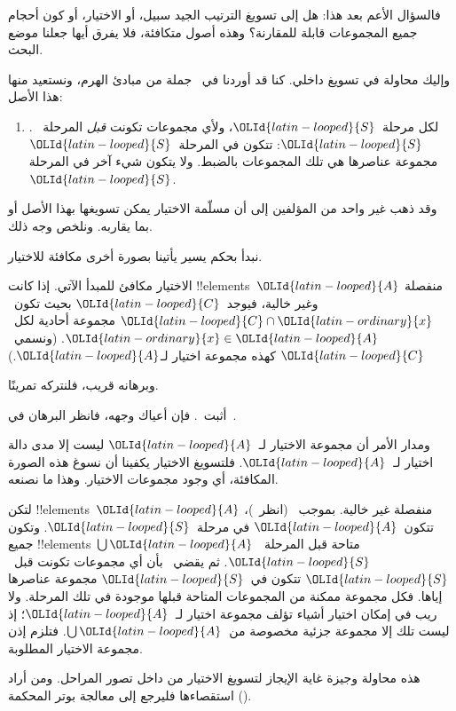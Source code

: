 \documentclass[../../../include/open-logic-section]{subfiles}
\begin{document}

فالسؤال الأعم بعد هذا: هل إلى تسويغ الترتيب الجيد سبيل، أو الاختيار،
أو كون أحجام جميع المجموعات قابلة للمقارنة؟ وهذه أصول متكافئة، فلا
يفرق أيها جعلنا موضع البحث.

وإليك محاولة في تسويغ داخلي. كنا قد أوردنا في~
جملة من مبادئ الهرم، ونستعيد منها هذا الأصل:
\begin{enumerate}
	\item[] \stagesacc. لكل مرحلة~${\OLId{latin-looped}{S}}$، ولأي مجموعات تكونت
	\emph{قبل} المرحلة~${\OLId{latin-looped}{S}}$: تتكون في المرحلة~${\OLId{latin-looped}{S}}$ مجموعة عناصرها هي تلك
	المجموعات بالضبط. ولا يتكون شيء آخر في المرحلة~${\OLId{latin-looped}{S}}$.
\end{enumerate}
وقد ذهب غير واحد من المؤلفين إلى أن مسلّمة الاختيار يمكن تسويغها بهذا
الأصل أو بما يقاربه. ونلخص وجه ذلك.

نبدأ بحكم يسير يأتينا بصورة أخرى مكافئة للاختيار.

\begin{thm}[في $\ZF$]
الاختيار مكافئ للمبدأ الآتي. إذا كانت !!{element}s~${\OLId{latin-looped}{A}}$ منفصلة وغير
خالية، فيوجد~${\OLId{latin-looped}{C}}$ بحيث تكون~${\OLId{latin-looped}{C}} \cap {\OLId{latin-ordinary}{x}}$ مجموعة أحادية لكل~${\OLId{latin-ordinary}{x}} \in {\OLId{latin-looped}{A}}$.
(ونسمي~${\OLId{latin-looped}{C}}$ كهذه {مجموعة اختيار} لـ${\OLId{latin-looped}{A}}$.)
\end{thm}

وبرهانه قريب، فلنتركه تمرينًا.

\begin{prob}
أثبت~. فإن أعياك وجهه،
فانظر البرهان في~\cite[pp.~242--3]{Potter2004}.
\end{prob}

ومدار الأمر أن مجموعة الاختيار لـ~${\OLId{latin-looped}{A}}$ ليست إلا مدى دالة اختيار
لـ~${\OLId{latin-looped}{A}}$. فلتسويغ الاختيار يكفينا أن نسوغ هذه الصورة المكافئة، أي وجود
مجموعات الاختيار. وهذا ما نصنعه.

لتكن !!{element}s~${\OLId{latin-looped}{A}}$ منفصلة غير خالية. بموجب~\stageshier{}
(انظر~)، تتكون~${\OLId{latin-looped}{A}}$ في مرحلة~${\OLId{latin-looped}{S}}$. وتكون جميع
!!{element}s~$\bigcup {\OLId{latin-looped}{A}}$ متاحة قبل المرحلة~${\OLId{latin-looped}{S}}$. ثم يقضي~\stagesacc{}
بأن أي مجموعات تكونت قبل~${\OLId{latin-looped}{S}}$ تتكون في~${\OLId{latin-looped}{S}}$ مجموعة عناصرها إياها. فكل
مجموعة ممكنة من المجموعات المتاحة قبلها موجودة في تلك المرحلة. ولا ريب في
إمكان اختيار أشياء تؤلف مجموعة اختيار لـ~${\OLId{latin-looped}{A}}$؛ إذ ليست تلك إلا مجموعة
جزئية مخصوصة من~$\bigcup {\OLId{latin-looped}{A}}$. فتلزم إذن مجموعة الاختيار المطلوبة.

هذه محاولة وجيزة غاية الإيجاز لتسويغ الاختيار من داخل تصور المراحل.
ومن أراد استقصاءها فليرجع إلى معالجة بوتر المحكمة
(\citeyear[\S14.8]{Potter2004}).
\end{document}
